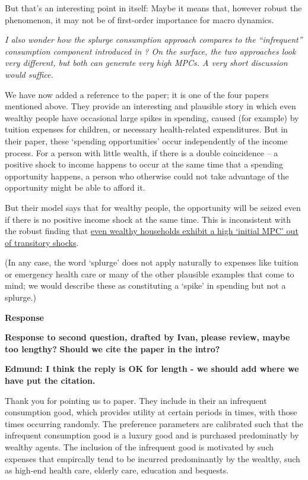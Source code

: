 \documentclass[12pt,letterpaper,english]{article}
\begin{document}
\begin{enumerate}
  But that's an interesting point in itself: Maybe it means that, however robust the phenomenon, it may not be of first-order importance for macro dynamics.
  
  \textit{I also wonder how the splurge consumption approach compares to the ``infrequent'' consumption component introduced in \citet{melcangiStock}? On the surface, the two approaches look very different, but both can generate very	high MPCs. A very short discussion would suffice.}

  We have now added a reference to the \citet{melcangiStock} paper; it is one of the four papers mentioned above.  They provide an interesting and plausible story in which even wealthy people have occasional large spikes in spending, caused (for example) by tuition expenses for children, or necessary health-related expenditures. But in their paper, these `spending opportunities' occur independently of the income process.  For a person with little wealth, if there is a double coincidence -- a positive shock to income happens to occur at the same time that a spending opportunity happens, a person who otherwise could not take advantage of the opportunity might be able to afford it.

  But their model says that for wealthy people, the opportunity will be seized even if there is no positive income shock at the same time.  This is inconsistent with the robust finding that \href{llorracc.github.io/HAFiscal/#wealthy-high-MPC}{even wealthy households exhibit a high `initial MPC' out of transitory shocks}.

  (In any case, the word `splurge' does not apply naturally to expenses like tuition or emergency health care or many of the other plausible examples that come to mind; we would describe these as constituting a `spike' in spending but not a splurge.)

\noindent \textbf{Response} 

\textbf{Response to second question, drafted by Ivan, please review, maybe too lengthy?} \textbf{Should we cite the paper in the intro?} 

\textbf{Edmund: I think the reply is OK for length - we should add where we have put the citation.}

Thank you for pointing us to \citet{melcangiStock} paper. They include in their an infrequent consumption good, which provides utility at certain periods in times, with those times occurring randomly. The preference parameters are calibrated such that the infrequent consumption good is a luxury good and is purchased predominatly by wealthy agents. The inclusion of the infrequent good is motivated by such expenses that empircally tend to be incurred predominantly by the wealthy, such as high-end health care, elderly care, education and bequests.


\end{enumerate}
\end{document}
